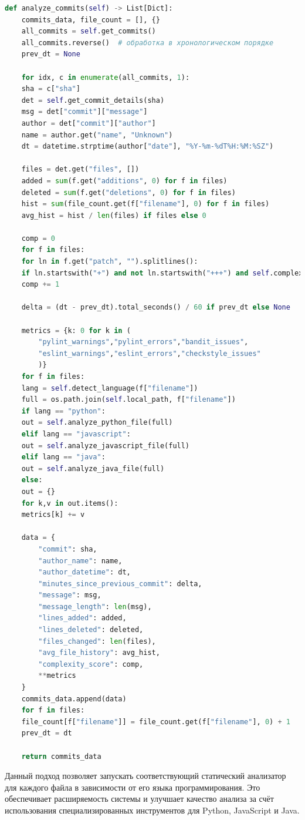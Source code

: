 \begin{lstlisting}[language=Python, caption={Анализ коммитов в методе \texttt{analyze\_commits}}]
	def analyze_commits(self) -> List[Dict]:
	commits_data, file_count = [], {}
	all_commits = self.get_commits()
	all_commits.reverse()  # обработка в хронологическом порядке
	prev_dt = None
	
	for idx, c in enumerate(all_commits, 1):
	sha = c["sha"]
	det = self.get_commit_details(sha)
	msg = det["commit"]["message"]
	author = det["commit"]["author"]
	name = author.get("name", "Unknown")
	dt = datetime.strptime(author["date"], "%Y-%m-%dT%H:%M:%SZ")
	
	files = det.get("files", [])
	added = sum(f.get("additions", 0) for f in files)
	deleted = sum(f.get("deletions", 0) for f in files)
	hist = sum(file_count.get(f["filename"], 0) for f in files)
	avg_hist = hist / len(files) if files else 0
	
	comp = 0
	for f in files:
	for ln in f.get("patch", "").splitlines():
	if ln.startswith("+") and not ln.startswith("+++") and self.complexity_re.search(ln):
	comp += 1
	
	delta = (dt - prev_dt).total_seconds() / 60 if prev_dt else None
	
	metrics = {k: 0 for k in (
		"pylint_warnings","pylint_errors","bandit_issues",
		"eslint_warnings","eslint_errors","checkstyle_issues"
		)}
	for f in files:
	lang = self.detect_language(f["filename"])
	full = os.path.join(self.local_path, f["filename"])
	if lang == "python":
	out = self.analyze_python_file(full)
	elif lang == "javascript":
	out = self.analyze_javascript_file(full)
	elif lang == "java":
	out = self.analyze_java_file(full)
	else:
	out = {}
	for k,v in out.items():
	metrics[k] += v
	
	data = {
		"commit": sha,
		"author_name": name,
		"author_datetime": dt,
		"minutes_since_previous_commit": delta,
		"message": msg,
		"message_length": len(msg),
		"lines_added": added,
		"lines_deleted": deleted,
		"files_changed": len(files),
		"avg_file_history": avg_hist,
		"complexity_score": comp,
		**metrics
	}
	commits_data.append(data)
	for f in files:
	file_count[f["filename"]] = file_count.get(f["filename"], 0) + 1
	prev_dt = dt
	
	return commits_data
\end{lstlisting}

Данный подход позволяет запускать соответствующий статический анализатор для каждого файла в зависимости от его языка программирования. Это обеспечивает расширяемость системы и улучшает качество анализа за счёт использования специализированных инструментов для Python, JavaScript и Java.



